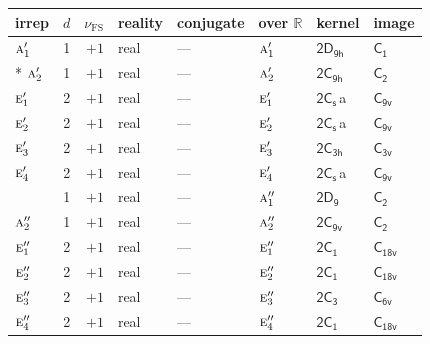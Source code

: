 \documentclass[10pt,a4paper]{article}
\numberwithin{equation}{section}
\newcommand{\grp}[1]{\mathsf{#1}}
\newcommand{\irr}[1]{\text{\normalfont\scshape #1}}
\newcommand{\detbox}[1]{{\setlength{\fboxsep}{1pt}\fbox{#1}}}
\newcommand{\clsletter}[1]{\,{\scriptsize\color{black!55}#1}}
\newcommand{\fsind}{\nu_{\mathrm{FS}}}
\begin{document}
\setlength{\emergencystretch}{2em}\par\setlength{\emergencystretch}{0pt}
{\small\renewcommand{\arraystretch}{1.25}\setlength{\tabcolsep}{4pt}\begin{longtable}{@{}lrrlllll@{}}\toprule
irrep & $d$ & $\fsind$ & reality & conjugate & over $\mathbb{R}$ & kernel & image\\\midrule\endhead
\bottomrule\endfoot\endlastfoot
$\irr{a}_{1}'$ & 1 & $+1$ & real & --- & $\irr{a}_{1}'$ & \href{2D9h.pdf}{$\grp{2D_{9h}}$} & \href{../../../rotation/data/pdf/C1.pdf}{$\grp{C_{1}}$}\\*
$\irr{a}_{2}'$ & 1 & $+1$ & real & --- & $\irr{a}_{2}'$ & \href{2C9h.pdf}{$\grp{2C_{9h}}$} & \href{../../../rotation/data/pdf/C2.pdf}{$\grp{C_{2}}$}\\
$\irr{e}_{1}'$ & 2 & $+1$ & real & --- & $\irr{e}_{1}'$ & \href{2C1v.pdf}{$\grp{2C_{s}}$}\clsletter{a} & \href{../../../rotation/data/pdf/C9v.pdf}{$\grp{C_{9v}}$}\\
$\irr{e}_{2}'$ & 2 & $+1$ & real & --- & $\irr{e}_{2}'$ & \href{2C1v.pdf}{$\grp{2C_{s}}$}\clsletter{a} & \href{../../../rotation/data/pdf/C9v.pdf}{$\grp{C_{9v}}$}\\
$\irr{e}_{3}'$ & 2 & $+1$ & real & --- & $\irr{e}_{3}'$ & \href{2C3h.pdf}{$\grp{2C_{3h}}$} & \href{../../../rotation/data/pdf/C3v.pdf}{$\grp{C_{3v}}$}\\
$\irr{e}_{4}'$ & 2 & $+1$ & real & --- & $\irr{e}_{4}'$ & \href{2C1v.pdf}{$\grp{2C_{s}}$}\clsletter{a} & \href{../../../rotation/data/pdf/C9v.pdf}{$\grp{C_{9v}}$}\\
\detbox{$\irr{a}_{1}''$} & 1 & $+1$ & real & --- & $\irr{a}_{1}''$ & \href{2D9.pdf}{$\grp{2D_{9}}$} & \href{../../../rotation/data/pdf/C2.pdf}{$\grp{C_{2}}$}\\
$\irr{a}_{2}''$ & 1 & $+1$ & real & --- & $\irr{a}_{2}''$ & \href{2C9v.pdf}{$\grp{2C_{9v}}$} & \href{../../../rotation/data/pdf/C2.pdf}{$\grp{C_{2}}$}\\
$\irr{e}_{1}''$ & 2 & $+1$ & real & --- & $\irr{e}_{1}''$ & \href{2C1.pdf}{$\grp{2C_{1}}$} & $\grp{C_{18v}}$\\
$\irr{e}_{2}''$ & 2 & $+1$ & real & --- & $\irr{e}_{2}''$ & \href{2C1.pdf}{$\grp{2C_{1}}$} & $\grp{C_{18v}}$\\
$\irr{e}_{3}''$ & 2 & $+1$ & real & --- & $\irr{e}_{3}''$ & \href{2C3.pdf}{$\grp{2C_{3}}$} & \href{../../../rotation/data/pdf/C6v.pdf}{$\grp{C_{6v}}$}\\
$\irr{e}_{4}''$ & 2 & $+1$ & real & --- & $\irr{e}_{4}''$ & \href{2C1.pdf}{$\grp{2C_{1}}$} & $\grp{C_{18v}}$\\

\end{longtable}}
\end{document}
